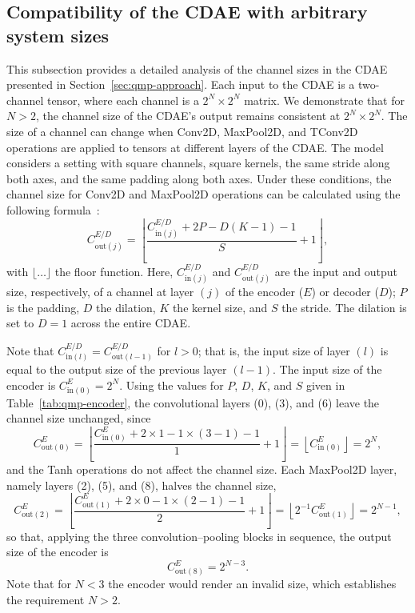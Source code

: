 \FloatBarrier

\subsection{Compatibility of the CDAE with arbitrary system sizes}
\label{sec:qmp-channel-sizes}

This subsection provides a detailed analysis of the channel sizes in the CDAE presented in Section~\ref{sec:qmp-approach}. Each input to the CDAE is a two-channel tensor, where each channel is a $2^N \times 2^N$ matrix. We demonstrate that for $N > 2$, the channel size of the CDAE's output remains consistent at $2^N \times 2^N$. The size of a channel can change when Conv2D, MaxPool2D, and TConv2D operations are applied to tensors at different layers of the CDAE. The model considers a setting with square channels, square kernels, the same stride along both axes, and the same padding along both axes. Under these conditions, the channel size for Conv2D and MaxPool2D operations can be calculated using the following formula~\cite{dumoulin2018}:
\begin{equation}
\label{eq:qmp-conv-size}
C^{E/D}_{\mathrm{out}(j)} = \left\lfloor \frac{C^{E/D}_{\mathrm{in}(j)} + 2P - D(K-1) - 1}{S} + 1 \right\rfloor,
\end{equation}
with $\lfloor \ldots \rfloor$ the floor function. Here, $C^{E/D}_{\mathrm{in}(j)}$ and $C^{E/D}_{\mathrm{out}(j)}$ are the input and output size, respectively, of a channel at layer $(j)$ of the encoder ($E$) or decoder ($D$); $P$ is the padding, $D$ the dilation, $K$ the kernel size, and $S$ the stride. The dilation is set to $D = 1$ across the entire CDAE.

Note that $C^{E/D}_{\mathrm{in}(l)} = C^{E/D}_{\mathrm{out}(l-1)}$ for $l > 0$; that is, the input size of layer $(l)$ is equal to the output size of the previous layer $(l-1)$. The input size of the encoder is $C^{E}_{\mathrm{in}(0)} = 2^N$. Using the values for $P$, $D$, $K$, and $S$ given in Table~\ref{tab:qmp-encoder}, the convolutional layers (0), (3), and (6) leave the channel size unchanged, since
\begin{equation}
C^{E}_{\mathrm{out}(0)} = \left\lfloor \frac{C^{E}_{\mathrm{in}(0)} + 2 \times 1 - 1 \times (3-1) - 1}{1} + 1 \right\rfloor = \left\lfloor C^{E}_{\mathrm{in}(0)} \right\rfloor = 2^N,
\end{equation}
and the Tanh operations do not affect the channel size. Each MaxPool2D layer, namely layers (2), (5), and (8), halves the channel size,
\begin{equation}
C^{E}_{\mathrm{out}(2)} = \left\lfloor \frac{C^{E}_{\mathrm{out}(1)} + 2 \times 0 - 1 \times (2-1) - 1}{2} + 1 \right\rfloor = \left\lfloor 2^{-1} C^{E}_{\mathrm{out}(1)} \right\rfloor = 2^{N-1},
\end{equation}
so that, applying the three convolution--pooling blocks in sequence, the output size of the encoder is
\begin{equation}
C^{E}_{\mathrm{out}(8)} = 2^{N-3}.
\end{equation}
Note that for $N < 3$ the encoder would render an invalid size, which establishes the requirement $N > 2$.

